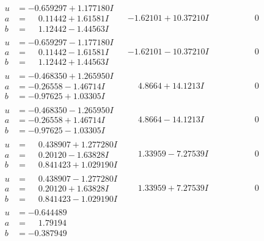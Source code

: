 \documentclass[1p]{elsarticle_modified}
\theoremstyle{definition}
\begin{document}
$$\begin{array}{c|c|c}
\begin{aligned}
u &= -0.659297 + 1.177180 I \\
a &= \phantom{-}0.11442 + 1.61581 I \\
b &= \phantom{-}1.12442 - 1.44563 I\end{aligned}
 & -1.62101 + 10.37210 I & \phantom{-0.000000 } 0 \\ \hline\begin{aligned}
u &= -0.659297 - 1.177180 I \\
a &= \phantom{-}0.11442 - 1.61581 I \\
b &= \phantom{-}1.12442 + 1.44563 I\end{aligned}
 & -1.62101 - 10.37210 I & \phantom{-0.000000 } 0 \\ \hline\begin{aligned}
u &= -0.468350 + 1.265950 I \\
a &= -0.26558 - 1.46714 I \\
b &= -0.97625 + 1.03305 I\end{aligned}
 & \phantom{-}4.8664 + 14.1213 I & \phantom{-0.000000 } 0 \\ \hline\begin{aligned}
u &= -0.468350 - 1.265950 I \\
a &= -0.26558 + 1.46714 I \\
b &= -0.97625 - 1.03305 I\end{aligned}
 & \phantom{-}4.8664 - 14.1213 I & \phantom{-0.000000 } 0 \\ \hline\begin{aligned}
u &= \phantom{-}0.438907 + 1.277280 I \\
a &= \phantom{-}0.20120 - 1.63828 I \\
b &= \phantom{-}0.841423 + 1.029190 I\end{aligned}
 & \phantom{-}1.33959 - 7.27539 I & \phantom{-0.000000 } 0 \\ \hline\begin{aligned}
u &= \phantom{-}0.438907 - 1.277280 I \\
a &= \phantom{-}0.20120 + 1.63828 I \\
b &= \phantom{-}0.841423 - 1.029190 I\end{aligned}
 & \phantom{-}1.33959 + 7.27539 I & \phantom{-0.000000 } 0 \\ \hline\begin{aligned}
u &= -0.644489\phantom{ +0.000000I} \\
a &= \phantom{-}1.79194\phantom{ +0.000000I} \\
b &= -0.387949\phantom{ +0.000000I}\end{aligned}

\end{array}$$
\end{document}
